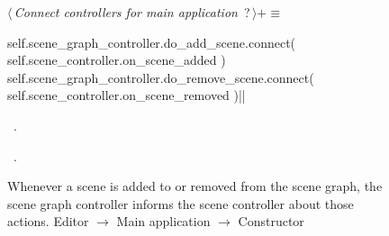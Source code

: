 \documentclass[%
    a4paper,    %
    justified,  %
    nobib,      %
    openany     %
]{tufte-book}
\makeatletter
\renewcommand{\label}[1]{\@tufte@label{##1}}%
\makeatother
\begin{document}
\begin{figure}
\begin{flushleft} \small
\begin{minipage}{\linewidth}\label{scrap86}\raggedright\small
{} $\langle\,${\itshape Connect controllers for main application}\nobreak\ {\footnotesize {?}}$\,\rangle+\equiv$
\vspace{-1ex}
\begin{pythoncode}
self.scene_graph_controller.do_add_scene.connect(
    self.scene_controller.on_scene_added
)
self.scene_graph_controller.do_remove_scene.connect(
    self.scene_controller.on_scene_removed
)|\NWsep|
\end{pythoncode}
\vspace{1.5ex}
\footnotesize
\begin{list}{}{\setlength{\itemsep}{-\parsep}\setlength{\itemindent}{-\leftmargin}}
\item \NWtxtMacroDefBy\ .
\item \NWtxtMacroRefIn\ .

\item{}
\end{list}
\end{minipage}\vspace{4ex}
\end{flushleft}
\caption{Whenever a scene is added to or removed from the scene graph, the scene graph
  controller informs the scene controller about those actions.
  \newline{}\newline{}Editor $\rightarrow$ Main application $\rightarrow$
  Constructor}
\label{editor:lst:main-application:constructor:connect-scene-controllers-add-remove}
\end{figure}

\end{document}
